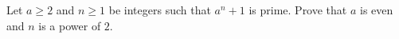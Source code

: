 Let $a\ge2$ and $n\ge1$ be integers such that $a^n+1$ is prime. Prove that $a$ is even and $n$ is a power of $2$.
